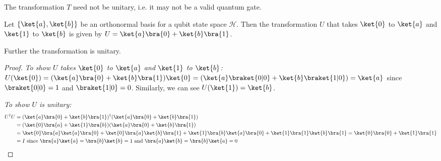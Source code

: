 \begin{note}
    The transformation $T$ need not be unitary, i.e. it may not be a valid quantum gate.
\end{note}

\begin{prop}
    \label{compbasischange}
    Let $\{ \ket{a}, \ket{b} \}$ be an orthonormal basis for a qubit state space $\mathcal{H}$.
    Then the transformation $U$ that takes $\ket{0}$ to $\ket{a}$ and $\ket{1}$ to $\ket{b}$ is given by $U = \ket{a}\bra{0} + \ket{b}\bra{1}$.

    Further the transformation is unitary.
\end{prop}
\begin{proof}
    \emph{To show $U$ takes $\ket{0}$ to $\ket{a}$ and $\ket{1}$ to $\ket{b}$:} \\
    $U (\ket{0}) = (\ket{a}\bra{0} + \ket{b}\bra{1}) \ket{0} = (\ket{a} \braket{0|0} + \ket{b} \braket{1|0}) = \ket{a}$ since $\braket{0|0} = 1$ and $\braket{1|0} = 0$.
    Similarly, we can see $U(\ket{1}) = \ket{b}$.

    \emph{To show $U$ is unitary:}\\
    \begin{align*}
        U^\dagger U & =  (\ket{a}\bra{0} + \ket{b}\bra{1})^\dagger (\ket{a}\bra{0} + \ket{b}\bra{1}) 
        \\ & = (\ket{0}\bra{a} + \ket{1}\bra{b})(\ket{a}\bra{0} + \ket{b}\bra{1}) 
        \\ & = \ket{0}\bra{a}\ket{a}\bra{0} + \ket{0}\bra{a}\ket{b}\bra{1} + \ket{1}\bra{b}\ket{a}\bra{0} + \ket{1}\bra{1}\ket{b}\bra{1} = \ket{0}\bra{0} + \ket{1}\bra{1} 
        \\ & = I \text{ since $\bra{a}\ket{a} = \bra{b} \ket{b} = 1$ and $\bra{a}\ket{b} = \bra{b}\ket{a} = 0$}
    \end{align*}
\end{proof}

